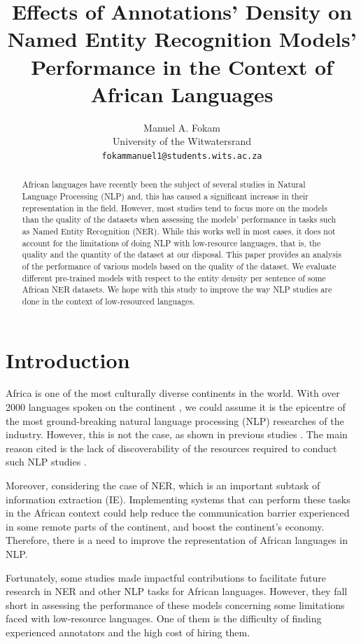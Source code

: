 \documentclass[11pt,a4paper]{article}
\title{Effects of Annotations’ Density on Named Entity Recognition Models’ Performance in the Context of African Languages}
\author{Manuel A. Fokam \\
  University of the Witwatersrand \\
  \texttt{fokammanuel1@students.wits.ac.za}}
\begin{document}
\maketitle

\begin{abstract}
African languages have recently been the subject of several studies in Natural Language Processing (NLP) and, this has caused a significant increase in their representation in the field. However, most studies tend to focus more on the models than the quality of the datasets when assessing the models' performance in tasks such as Named Entity Recognition (NER). While this works well in most cases, it does not account for the limitations of doing NLP with low-resource languages, that is, the quality and the quantity of the dataset at our disposal. This paper provides an analysis of the performance of various models based on the quality of the dataset. We evaluate different pre-trained models with respect to the entity density per sentence of some African NER datasets. We hope with this study to improve the way NLP studies are done in the context of low-resourced languages.
\end{abstract}

\section{Introduction}

Africa is one of the most culturally diverse continents in the world. With over 2000 languages spoken on the continent \cite{eberhard_simons_fennig}, we could assume it is the epicentre of the most ground-breaking natural language processing (NLP) researches of the industry. However, this is not the case, as shown in previous studies \cite{nekoto-etal-2020-participatory, Dossou2021CrowdsourcedPT}. The main reason cited is the lack of discoverability of the resources required to conduct such NLP studies \cite{Martinus2019AFO}.

Moreover, considering the case of NER, which is an important subtask of information extraction (IE). Implementing systems that can perform these tasks in the African context could help reduce the communication barrier experienced in some remote parts of the continent, and boost the continent's economy. Therefore, there is a need to improve the representation of African languages in NLP.

Fortunately, some studies made impactful contributions to facilitate future research in NER \cite{10.1162/tacl_a_00416} and other NLP tasks \cite{DBLP:journals/corr/abs-2104-01443, DBLP:journals/corr/abs-2103-08647, DBLP:journals/corr/abs-2103-15963} for African languages. However, they fall short in assessing the performance of these models concerning some limitations faced with low-resource languages. One of them is the difficulty of finding experienced annotators and the high cost of hiring them.
\end{document}
